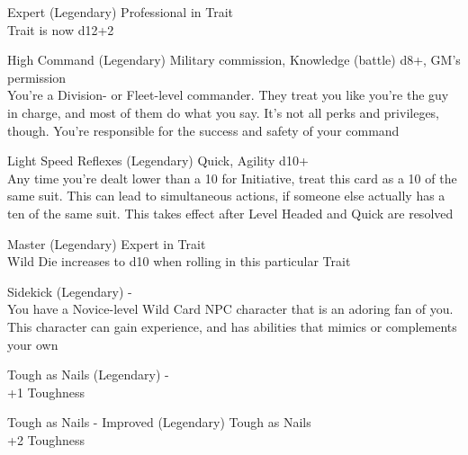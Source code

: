 \begin{multicols}{2}
\begin{genericsection}{Expert (Legendary)}
Professional in Trait\\
Trait is now d12+2
\end{genericsection}

\begin{genericsection}{High Command (Legendary)}
Military commission, Knowledge (battle) d8+, GM's permission\\
You’re a Division- or Fleet-level commander. They treat you like you’re the guy in charge, and most of them do what you say. It’s not all perks and privileges, though. You’re responsible for the success and safety of your command
\end{genericsection}

\begin{genericsection}{Light Speed Reflexes (Legendary)}
Quick, Agility d10+\\
Any time you're dealt lower than a 10 for Initiative, treat this card as a 10 of the same suit. This can lead to simultaneous actions, if someone else actually has a ten of the same suit. This takes effect after Level Headed and Quick are resolved
\end{genericsection}

\begin{genericsection}{Master (Legendary)}
Expert in Trait\\
Wild Die increases to d10 when rolling in this particular Trait
\end{genericsection}

\begin{genericsection}{Sidekick (Legendary)}
-\\
You have a Novice-level Wild Card NPC character that is an adoring fan of you. This character can gain experience, and has abilities that mimics or complements your own
\end{genericsection}

\begin{genericsection}{Tough as Nails (Legendary)}
-\\
+1 Toughness
\end{genericsection}

\begin{genericsection}{Tough as Nails - Improved (Legendary)}
Tough as Nails\\
+2 Toughness
\end{genericsection}


\end{multicols}
